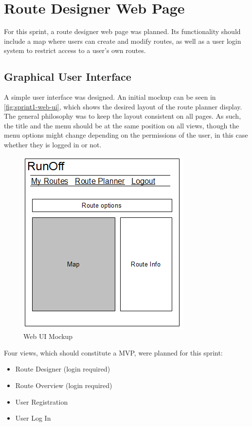 \section{Route Designer Web Page}
\label{sec:sprint1-web}

For this sprint, a route designer web page was planned. Its functionality should include a map where users can create and modify routes, as well as a user login system to restrict access to a user's own routes.

\subsection{Graphical User Interface}
\label{sub:sprint1-web-gui}

A simple user interface was designed. An initial mockup can be seen in \autoref{fig:sprint1-web-ui}, which shows the desired layout of the route planner display. The general philosophy was to keep the layout consistent on all pages. As such, the title and the menu should be at the same position on all views, though the menu options might change depending on the permissions of the user, in this case whether they is logged in or not.

\begin{figure}[!ht]
	\centering
	\includegraphics[scale=1]{img/webmockup1.png}
	\caption{Web UI Mockup}
	\label{fig:sprint1-web-ui}
\end{figure}

Four views, which should constitute a \ac{MVP}, were planned for this sprint:

\begin{itemize}
	\item{Route Designer} (login required)
	\item{Route Overview} (login required)
	\item{User Registration}
	\item{User Log In}
\end{itemize}

